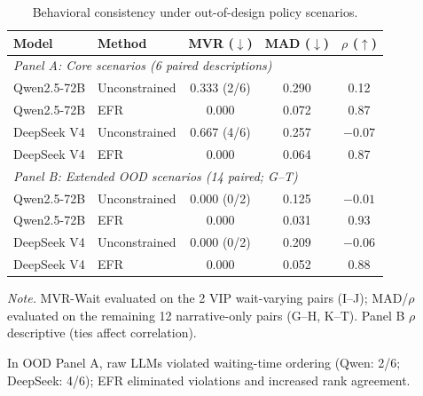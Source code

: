 \documentclass[12pt]{article}
\begin{document}
\begin{table}[t]
\centering
\caption{Behavioral consistency under out-of-design policy scenarios.}
\label{tab:out_of_design}
\footnotesize
\setlength{\tabcolsep}{3pt}
\begin{tabular}{@{}p{2.8cm}lccc@{}}
\toprule
Model & Method & MVR ($\downarrow$) & MAD ($\downarrow$) & $\rho$ ($\uparrow$)\\
\midrule

\multicolumn{5}{l}{\textit{Panel A: Core scenarios (6 paired descriptions)}}\\

Qwen2.5-72B
& Unconstrained
& 0.333 (2/6)
& 0.290
& 0.12 \\

Qwen2.5-72B
& EFR
& 0.000
& 0.072
& 0.87 \\

DeepSeek V4
& Unconstrained
& 0.667 (4/6)
& 0.257
& $-0.07$ \\

DeepSeek V4
& EFR
& 0.000
& 0.064
& 0.87 \\

\midrule

\multicolumn{5}{l}{\textit{Panel B: Extended OOD scenarios (14 paired; G--T)}}\\

Qwen2.5-72B
& Unconstrained
& 0.000 (0/2)
& 0.125
& $-0.01$ \\

Qwen2.5-72B
& EFR
& 0.000
& 0.031
& 0.93 \\

DeepSeek V4
& Unconstrained
& 0.000 (0/2)
& 0.209
& $-0.06$ \\

DeepSeek V4
& EFR
& 0.000
& 0.052
& 0.88 \\

\bottomrule
\end{tabular}

\vspace{0.4em}

\begin{minipage}{\textwidth}
\footnotesize
\textit{Note.}
MVR-Wait evaluated on the 2 VIP wait-varying pairs (I--J); MAD/$\rho$ evaluated on the remaining 12 narrative-only pairs (G--H, K--T). Panel B $\rho$ descriptive (ties affect correlation).
\end{minipage}
\end{table}

In OOD Panel A, raw LLMs violated waiting-time ordering (Qwen: 2/6; DeepSeek: 4/6); EFR eliminated violations and increased rank agreement.
\end{document}
